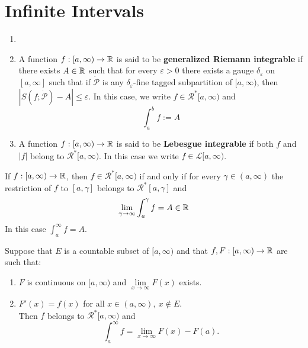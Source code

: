 \section{Infinite Intervals}

\begin{definition}
	\begin{enumerate}
		\item[]
		\item A function $f:[a,\infty) \to \mathbb{R}$ is said to be  \textbf{generalized Riemann integrable} if there exists $A \in \mathbb{R}$ such that for every $\varepsilon>0$ there exists a gauge $\delta_\varepsilon$ on $[a,\infty]$ such that if $\dot{\mathcal{P}}$ is any $\delta_\varepsilon$-fine tagged subpartition of $[a,\infty)$, then $|S(f;\dot{\mathcal{P}})-A|\leq \varepsilon$. In this case, we write $f \in \mathcal{R}^*[a,\infty)$ and
		      \[\displaystyle\int_{a}^{b}f:=A\]
		\item A function $f:[a,\infty) \to \mathbb{R}$ is said to be \textbf{Lebesgue integrable} if both $f$ and $|f|$ belong to $\mathcal{R}^*[a,\infty)$. In this case we write $f \in \mathcal{L}[a,\infty)$.
	\end{enumerate}
\end{definition}

\begin{theorem}
	If $f:[a,\infty) \to \mathbb{R}$, then $f \in \mathcal{R}^*[a,\infty)$ if and only if for every $\gamma \in (a,\infty)$ the restriction of $f$ to $[a,\gamma]$ belongs to $\mathcal{R}^*[a,\gamma]$ and
	\[\lim\limits_{\gamma\to\infty}\displaystyle\int_{a}^{\gamma}f=A\in\mathbb{R}\]
	In this case $\displaystyle\int_{a}^{\infty}f=A$.
\end{theorem}

\begin{theorem}
	Suppose that $E$ is a countable subset of $[a,\infty)$ and that $f,F:[a,\infty)\to\mathbb{R}$ are such that:
	\begin{enumerate}
		\item $F$ is continuous on $[a,\infty)$ and $\lim\limits_{x \to \infty}F(x)$ exists.
		\item $F'(x)=f(x)$ for all $x \in (a,\infty),\ x \notin E$.
		      \\Then $f$ belongs to $\mathcal{R}^*[a,\infty)$ and
		      \[\displaystyle\int_{a}^{\infty}f=\lim\limits_{x \to \infty}F(x)-F(a).\]
	\end{enumerate}
\end{theorem}

